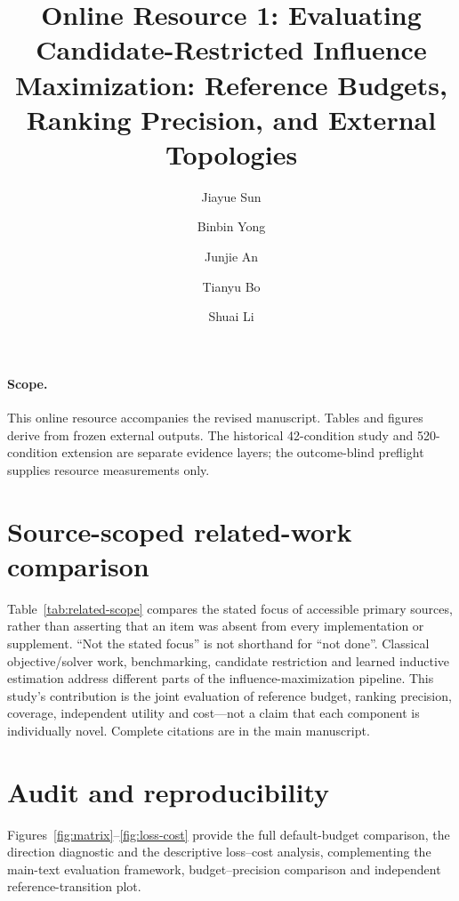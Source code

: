 \documentclass[smallextended]{svjour3}
\begin{document}
\title{Online Resource 1: Evaluating Candidate-Restricted Influence Maximization: Reference Budgets, Ranking Precision, and External Topologies}
\author{Jiayue Sun \and Binbin Yong \and Junjie An \and Tianyu Bo \and Shuai Li}
\date{}\maketitle
\paragraph{Scope.} This online resource accompanies the revised manuscript. Tables and figures derive from frozen external outputs. The historical 42-condition study and 520-condition extension are separate evidence layers; the outcome-blind preflight supplies resource measurements only.

\section{Source-scoped related-work comparison}
Table~\ref{tab:related-scope} compares the stated focus of accessible primary
sources, rather than asserting that an item was absent from every implementation
or supplement. ``Not the stated focus'' is not shorthand for ``not done''.
Classical objective/solver work, benchmarking, candidate restriction and learned
inductive estimation address different parts of the influence-maximization
pipeline. This study's contribution is the joint evaluation of reference budget,
ranking precision, coverage, independent utility and cost---not a claim that each
component is individually novel. Complete citations are in the main manuscript.


\section{Audit and reproducibility}
Figures~\ref{fig:matrix}--\ref{fig:loss-cost} provide the full default-budget
comparison, the direction diagnostic and the descriptive loss--cost analysis,
complementing the main-text evaluation framework, budget--precision comparison
and independent reference-transition plot.
\end{document}
